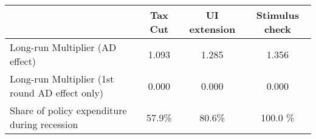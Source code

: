 \begin{tabular}{@{}lccc@{}} 
\toprule 
& Tax Cut    & UI extension    & Stimulus check    \\  \midrule 
Long-run Multiplier (AD effect) &1.093  & 1.285  & 1.356     \\ 
Long-run Multiplier (1st round AD effect only) &0.000  & 0.000  & 0.000     \\ 
Share of policy expenditure during recession &57.9\%  & 80.6\%  & 100.0 \%    \\ 
\end{tabular}  
